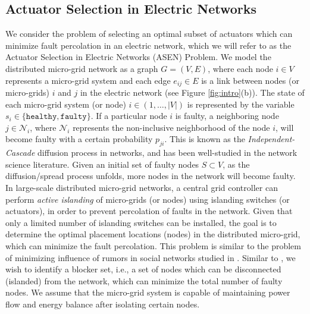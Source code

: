 \documentclass[twocolumn]{autart}    %
\begin{document}
\subsection{Actuator Selection in Electric Networks}
We consider the problem of selecting an optimal subset of actuators which can minimize fault percolation in an electric network, which we will refer to as the Actuator Selection in Electric Networks (ASEN) Problem. We model the distributed micro-grid network as a graph $G = (V,E)$, where each node $i \in V$ represents a micro-grid system and each edge $e_{ij} \in E$ is a link between nodes (or micro-grids) $i$ and $j$ in the electric network (see Figure \ref{fig:intro}(b)). The state of each micro-grid system (or node) $i \in (1, \hdots, |V|)$ is represented by the variable $s_i \in \{ \texttt{healthy}, \texttt{faulty} \}$. If a particular node $i$ is faulty, a neighboring node $j \in \mathcal{N}_i$, where $\mathcal{N}_i$ represents the non-inclusive neighborhood of the node $i$, will become faulty with a certain probability $p_{ji}$. This is known as the \textit{Independent-Cascade} diffusion process in networks, and has been well-studied in the network science literature. Given an initial set of faulty nodes $S \subset V$, as the diffusion/spread process unfolds, more nodes in the network will become faulty. In large-scale distributed micro-grid networks, a central grid controller can perform \textit{active islanding} of micro-grids (or nodes) using islanding switches (or actuators), in order to prevent percolation of faults in the network. Given that only a limited number of islanding switches can be installed, the goal is to determine the optimal placement locations (nodes) in the distributed micro-grid, which can minimize the fault percolation. This problem is similar to the problem of minimizing influence of rumors in social networks studied in \cite{yan2019minimizing}. Similar to \cite{yan2019minimizing}, we wish to identify a blocker set, i.e., a set of nodes which can be disconnected (islanded) from the network, which can minimize the total number of faulty nodes. We assume that the micro-grid system is capable of maintaining power flow and energy balance after isolating certain nodes.
\end{document}
